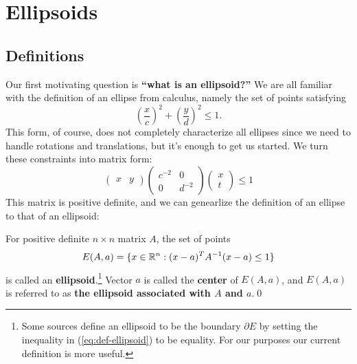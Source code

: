 
\section{Ellipsoids}


\subsection{Definitions}
Our first motivating question is \textbf{``what is an ellipsoid?''}
We are all familiar with the definition of an ellipse from
calculus, namely the set of points satisfying
%
\begin{equation}\label{eq:naive-ellipse}
  \left(\frac xc\right)^2 + \left(\frac yd\right)^2 \leq 1.
\end{equation}
%
This form, of course, does not completely characterize all ellipses since we
need to handle rotations and translations, but it's enough to get us started. We
turn these constraints into matrix form:
%
\begin{equation}\label{eq:naive-ellipse-matrix}
  \left(\begin{matrix}x&y\end{matrix}\right)
  \left(\begin{matrix}c^{-2} &0\\0&d^{-2}\end{matrix}\right)
    \left(\begin{matrix}x\\t\end{matrix}\right)\leq 1
\end{equation}
%
This matrix is positive definite, and we can genearlize the definition of an
ellipse to that of an ellipsoid:

\begin{defbox} 
  \begin{definition}[ellipsoid, \(E(A, a)\)]

    For positive definite \(n\times n\) matrix \(A\), the set of points
    \begin{equation}\label{eq:def-ellipsoid}
      E(A,a) = \{x \in \mathbb R^n : (x - a)^T A^{-1} (x - a) \leq 1\}
    \end{equation}
    is called an \textbf{ellipsoid}.\footnote{Some sources define an ellipsoid
    to be the boundary \(\partial E\) by setting the inequality in
    (\ref{eq:def-ellipsoid}) to be equality. For our purposes our current
    definition is more useful.}
    Vector \(a\) is called the \textbf{center}
    of \(E(A, a)\), and \(E(A,a)\) is referred to as \textbf{the ellipsoid
    associated with \(A\) and \(a\)}.\qed
  \end{definition}
\end{defbox}

